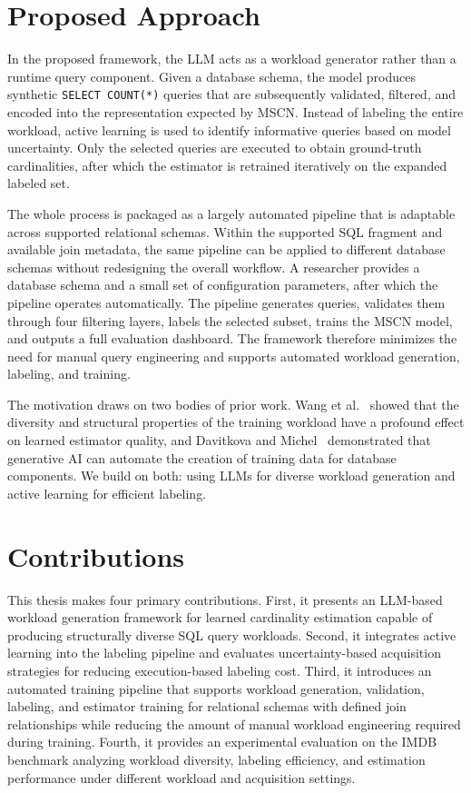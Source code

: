 \section{Proposed Approach}

In the proposed framework, the LLM acts as a workload generator rather than a runtime query component. Given a database schema, the model produces synthetic \texttt{SELECT COUNT(*)} queries that are subsequently validated, filtered, and encoded into the representation expected by MSCN. Instead of labeling the entire workload, active learning is used to identify informative queries based on model uncertainty. Only the selected queries are executed to obtain ground-truth cardinalities, after which the estimator is retrained iteratively on the expanded labeled set.

The whole process is packaged as a largely automated pipeline that is adaptable across supported relational schemas. Within the supported SQL fragment and available join metadata, the same pipeline can be applied to different database schemas without redesigning the overall workflow. A researcher provides a database schema and a small set of configuration parameters, after which the pipeline operates automatically. The pipeline generates queries, validates them through four filtering layers, labels the selected subset, trains the MSCN model, and outputs a full evaluation dashboard. The framework therefore minimizes the need for manual query engineering and supports automated workload generation, labeling, and training.

The motivation draws on two bodies of prior work. Wang et al.~\cite{DBLP:journals/pvldb/WangQWWZ21} showed that the diversity and structural properties of the training workload have a profound effect on learned estimator quality, and Davitkova and Michel~\cite{DBLP:journals/corr/abs-2512-20271} demonstrated that generative AI can automate the creation of training data for database components. We build on both: using LLMs for diverse workload generation and active learning for efficient labeling.

\section{Contributions}

This thesis makes four primary contributions. First, it presents an LLM-based workload generation framework for learned cardinality estimation capable of producing structurally diverse SQL query workloads. Second, it integrates active learning into the labeling pipeline and evaluates uncertainty-based acquisition strategies for reducing execution-based labeling cost. Third, it introduces an automated training pipeline that supports workload generation, validation, labeling, and estimator training for relational schemas with defined join relationships while reducing the amount of manual workload engineering required during training. Fourth, it provides an experimental evaluation on the IMDB benchmark analyzing workload diversity, labeling efficiency, and estimation performance under different workload and acquisition settings.